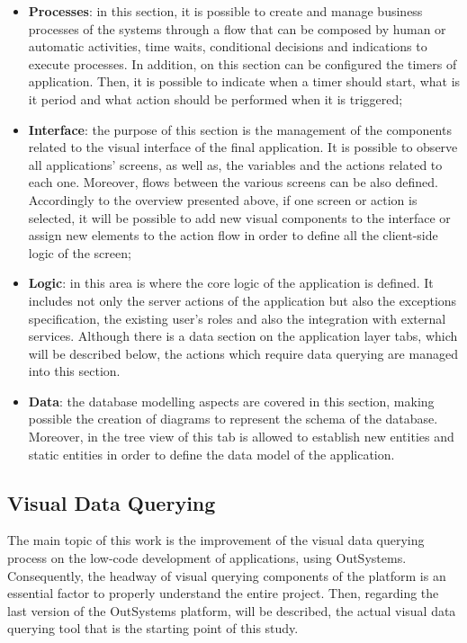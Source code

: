 \begin{itemize}
	\item \textbf{Processes}: in this section, it is possible to create and manage business processes of the systems through a flow that can be composed by human or automatic activities, time waits, conditional decisions and indications to execute processes. In addition, on this section can be configured the timers of application. Then, it is possible to indicate when a timer should start, what is it period and what action should be performed when it is triggered;
	\item \textbf{Interface}: the purpose of this section is the management of the components related to the visual interface of the final application. It is possible to observe all applications’ screens, as well as, the variables and the actions related to each one. Moreover, flows between the various screens can be also defined. Accordingly to the overview presented above, if one screen or action is selected, it will be possible to add new visual components to the interface or assign new elements to the action flow in order to define all the client-side logic of the screen;
	\item \textbf{Logic}: in this area is where the core logic of the application is defined. It includes not only the server actions of the application but also the exceptions specification, the existing user’s roles and also the integration with external services. Although there is a data section on the application layer tabs, which will be described below, the actions which require data querying are managed into this section.
	\item \textbf{Data}: the database modelling aspects are covered in this section, making possible the creation of diagrams to represent the schema of the database. Moreover, in the tree view of this tab is allowed to establish new entities and static entities in order to define the data model of the application.
\end{itemize}

\subsection{Visual Data Querying}
\label{subsec:visual_data_querying}

The main topic of this work is the improvement of the visual data querying process on the low-code development of applications, using OutSystems. Consequently, the headway of visual querying components of the platform is an essential factor to properly understand the entire project. Then, regarding the last version of the OutSystems platform, will be described, the actual visual data querying tool that is the starting point of this study.

